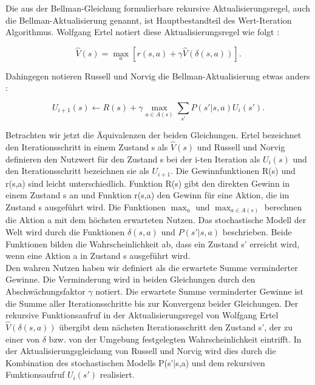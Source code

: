 Die aus der Bellman-Gleichung formulierbare rekursive Aktualisierungsregel, auch die Bellman-Aktualisierung genannt, ist Hauptbestandteil des Wert-Iteration Algorithmus. Wolfgang Ertel notiert diese Aktualisierungsregel wie folgt \cite[294]{Ertel}:

\begin{equation}
\hat{V}(s) = \max_a [r(s,a) + \gamma \hat{V}(\delta(s,a))].
\end{equation}

Dahingegen notieren Russell und Norvig die Bellman-Aktualisierung etwas anders \cite[760]{Russell}:

\begin{equation}
U_{i+1}(s) \leftarrow R(s) + \gamma \max_{a \in A(s)} \sum_{s'} P(s'|s,a)U_i(s').
\end{equation} 

Betrachten wir jetzt die Äquivalenzen der beiden Gleichungen. Ertel bezeichnet den Iterationsschritt in einem Zustand s als $\hat{V}(s)$ und Russell und Norvig definieren den Nutzwert für den Zustand s bei der i-ten Iteration als $U_{i}(s)$ und den Iterationsschritt bezeichnen sie als $U_{i+1}$. Die Gewinnfunktionen R(s) und r(s,a) sind leicht unterschiedlich. Funktion R(s) gibt den direkten Gewinn in einem Zustand s an und Funktion r(s,a) den Gewinn für eine Aktion, die im Zustand s ausgeführt wird. Die Funktionen $\max_a$ und $\max_{a \in A(s)}$ berechnen die Aktion a mit dem höchsten erwarteten Nutzen. Das stochastische Modell der Welt wird durch die Funktionen $\delta(s,a)$ und $P(s'|s,a)$ beschrieben. Beide Funktionen bilden die Wahrscheinlichkeit ab, dass ein Zustand s' erreicht wird, wenn eine Aktion a in Zustand s ausgeführt wird. \\

Den wahren Nutzen haben wir definiert als die erwartete Summe verminderter Gewinne. Die Verminderung wird in beiden Gleichungen durch den Abschwächungsfaktor $\gamma$ notiert. Die erwartete Summe verminderter Gewinne ist die Summe aller Iterationsschritte bis zur Konvergenz beider Gleichungen. Der rekursive Funktionsaufruf in der Aktualisierungsregel von Wolfgang Ertel $\hat{V}(\delta(s,a))$ übergibt dem nächsten Iterationsschritt den Zustand s', der zu einer von $\delta$ bzw. von der Umgebung festgelegten Wahrscheinlichkeit eintrifft. In der Aktualisierungsgleichung von Russell und Norvig wird dies durch die Kombination des stochastischen Modells P(s'|s,a) und dem rekursiven Funktionsaufruf $U_i(s')$ realisiert.\\ 

